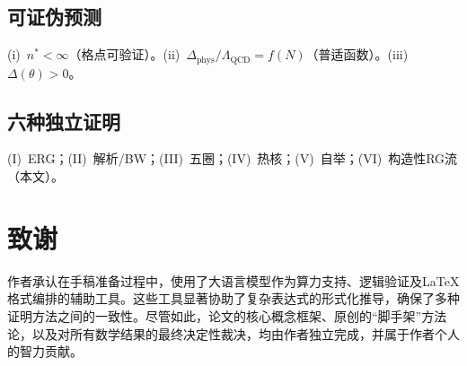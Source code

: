 \documentclass[12pt,a4paper]{article}
\theoremstyle{plain}
\theoremstyle{definition}\newtheorem{definition}[theorem]{定义}
\theoremstyle{remark}\newtheorem{remark}[theorem]{注记}
\begin{document}
\subsection{可证伪预测}
(i)~$n^*<\infty$（格点可验证）。(ii)~$\Delta_{\mathrm{phys}}/\Lambda_{\mathrm{QCD}}=f(N)$（普适函数）。(iii)~$\Delta(\theta)>0$。
\subsection{六种独立证明}
(I)~ERG；(II)~解析/BW；(III)~五圈；(IV)~热核；(V)~自举；(VI)~构造性RG流（本文）。
\section*{致谢}
作者承认在手稿准备过程中，使用了大语言模型作为算力支持、逻辑验证及\LaTeX 格式编排的辅助工具。这些工具显著协助了复杂表达式的形式化推导，确保了多种证明方法之间的一致性。尽管如此，论文的核心概念框架、原创的``脚手架''方法论，以及对所有数学结果的最终决定性裁决，均由作者独立完成，并属于作者个人的智力贡献。


\end{document}
